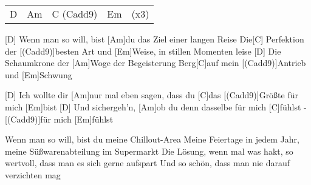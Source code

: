 

\begin{guitar}
	{\footnotesize\begin{tabular}{l|l|l|ll}
		D & Am & C (Cadd9) & Em & (x3)
	\end{tabular}}
	
	[D] Wenn man so will, bist [Am]du das Ziel einer langen Reise
	Die[C] Perfektion der [(Cadd9)]besten Art und [Em]Weise, in stillen Momenten leise
	[D] Die Schaumkrone der [Am]Woge der Begeisterung
	Berg[C]auf mein [(Cadd9)]Antrieb und [Em]Schwung
	
	[D] Ich wollte dir [Am]nur mal eben sagen, dass du [C]das [(Cadd9)]Größte für mich [Em]bist
	[D] Und sichergeh'n, [Am]ob du denn dasselbe für mich [C]fühlst - [(Cadd9)]für mich [Em]fühlst
	
	Wenn man so will, bist du meine Chillout-Area
	Meine Feiertage in jedem Jahr, meine Süßwarenabteilung im Supermarkt
	Die Lösung, wenn mal was hakt, so wertvoll, dass man es sich gerne aufspart
	Und so schön, dass man nie darauf verzichten mag
	
	 
	
	
	 
\end{guitar}